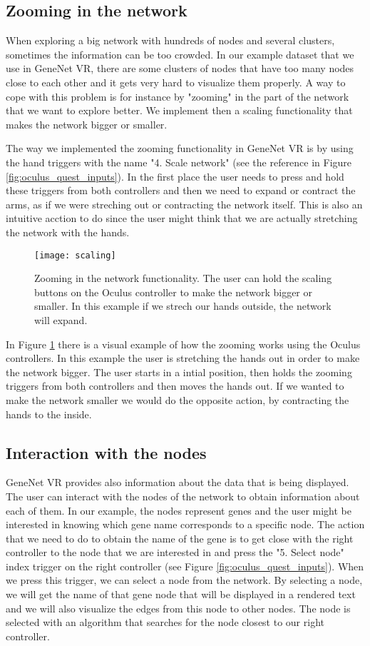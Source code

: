 \subsection{Zooming in the network}
When exploring a big network with hundreds of nodes and several clusters, sometimes the information can be too crowded. In our example dataset that we use in GeneNet VR, there are some clusters of nodes that have too many nodes close to each other and it gets very hard to visualize them properly. A way to cope with this problem is for instance by "zooming" in the part of the network that we want to explore better. We implement then a scaling functionality that makes the network bigger or smaller.

The way we implemented the zooming functionality in GeneNet VR is by using the hand triggers with the name "4. Scale network" (see the reference in Figure \ref{fig:oculus_quest_inputs}). In the first place the user needs to press and hold these triggers from both controllers and then we need to expand or contract the arms, as if we were streching out or contracting the network itself. This is also an intuitive acction to do since the user might think that we are actually stretching the network with the hands.

\begin{figure}[h!]
    \centering%
    \texttt{[image: scaling]}
    \caption{Zooming in the network functionality. The user can hold the scaling buttons on the Oculus controller to make the network bigger or smaller. In this example if we strech our hands outside, the network will expand.}
    \label{fig:scaling}
\end{figure}%


In Figure \ref{fig:scaling} there is a visual example of how the zooming works using the Oculus controllers. In this example the user is stretching the hands out in order to make the network bigger. The user starts in a intial position, then holds the zooming triggers from both controllers and then moves the hands out. If we wanted to make the network smaller we would do the opposite action, by contracting the hands to the inside.

\subsection{Interaction with the nodes}
GeneNet VR provides also information about the data that is being displayed. The user can interact with the nodes of the network to obtain information about each of them. In our example, the nodes represent genes and the user might be interested in knowing which gene name corresponds to a specific node. The action that we need to do to obtain the name of the gene is to get close with the right controller to the node that we are interested in and press the "5. Select node" index trigger on the right controller (see Figure \ref{fig:oculus_quest_inputs}). When we press this trigger, we can select a node from the network. By selecting a node, we will get the name of that gene node that will be displayed in a rendered text and we will also visualize the edges from this node to other nodes. The node is selected with an algorithm that searches for the node closest to our right controller.

